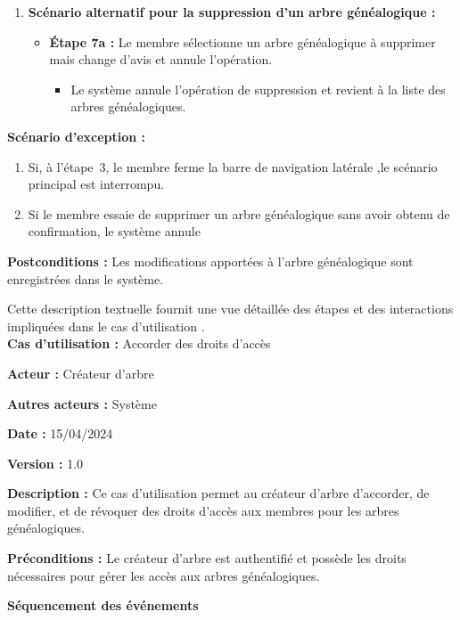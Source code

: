 \begin{enumerate}
    \item \textbf{Scénario alternatif pour la suppression d'un arbre généalogique :}
    \begin{itemize}
        \item \textbf{Étape 7a :} Le membre sélectionne un arbre généalogique à supprimer mais change d'avis et annule l'opération.
        \begin{itemize}
            \item Le système annule l'opération de suppression et revient à la liste des arbres généalogiques.
        \end{itemize}
    \end{itemize}


\end{enumerate}

\textbf{Scénario d'exception :}
\begin{enumerate}
  \item Si, à l’étape 3, le membre ferme la barre de navigation latérale
    ,le scénario principal est interrompu.

  \item Si le membre essaie de supprimer un arbre généalogique sans avoir
    obtenu de confirmation, le système annule
\end{enumerate}

\textbf{Postconditions :} Les modifications apportées à l'arbre généalogique
sont enregistrées dans le système.

Cette description textuelle fournit une vue détaillée des étapes et des
interactions impliquées dans le cas d’utilisation .
\\

\textbf{Cas d’utilisation :} Accorder des droits d’accès

\textbf{Acteur :} Créateur d'arbre

\textbf{Autres acteurs :} Système

\textbf{Date :} 15/04/2024

\textbf{Version :} 1.0


\textbf{Description :} Ce cas d’utilisation permet au créateur d'arbre d'accorder,
de modifier, et de révoquer des droits d'accès aux  membres pour
les arbres généalogiques.

\textbf{Préconditions :} Le créateur d'arbre est authentifié et possède les droits
nécessaires pour gérer les accès aux arbres généalogiques.


\textbf{Séquencement des événements}

